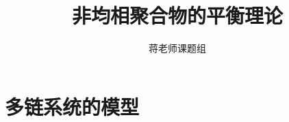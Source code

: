 \documentclass[12pt,a4paper]{article}
\title{非均相聚合物的平衡理论}
\author{蒋老师课题组}
\date{\chntoday}
\numberwithin{equation}{section}
\begin{document}
\maketitle
\section{}
\section{}
\section{}
\section{多链系统的模型}






\cite{tam19912d}

\end{document}
